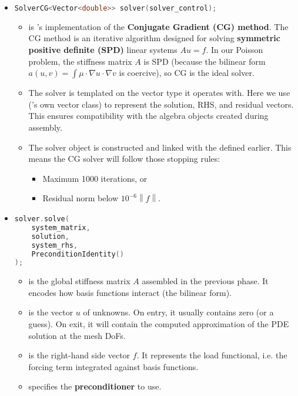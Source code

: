 \begin{itemize}
    \item {}
    \begin{lstlisting}[language=C++]
SolverCG<Vector<double>> solver(solver_control);\end{lstlisting}
    \begin{itemize}
        \item {} is 's implementation of the \textbf{Conjugate Gradient (CG) method}. The CG method is an iterative algorithm designed for solving \textbf{symmetric positive definite (SPD)} linear systems $Au=f$. In our Poisson problem, the stiffness matrix $A$ is SPD (because the bilinear form $a(u,v) = \int \mu \cdot \nabla u \cdot \nabla v$ is coercive), so CG is the ideal solver.
        
        \item The solver is templated on the vector type it operates with. Here we use  ('s own vector class) to represent the solution, RHS, and residual vectors. This ensures compatibility with the algebra objects created during assembly.
        
        \item The solver object is constructed and linked with the  defined earlier. This means the CG solver will follow those stopping rules:
        \begin{itemize}
            \item Maximum 1000 iterations, or
            \item Residual norm below $10^{-6} \left\| f \right\|$.
        \end{itemize}
    \end{itemize}


    \item {}
    \begin{lstlisting}[language=C++]
solver.solve(
    system_matrix,
    solution,
    system_rhs,
    PreconditionIdentity()
);\end{lstlisting}
    \begin{itemize}
        \item {} is the global stiffness matrix $A$ assembled in the previous phase. It encodes how basis functions interact (the bilinear form).
        \item {} is the vector $u$ of unknowns. On entry, it usually contains zero (or a guess). On exit, it will contain the computed approximation of the PDE solution at the mesh DoFs.
        \item {} is the right-hand side vector $f$. It represents the load functional, i.e. the forcing term integrated against basis functions.
        \item {} specifies the \textbf{preconditioner} to use.
        

\end{itemize}
\end{itemize}
